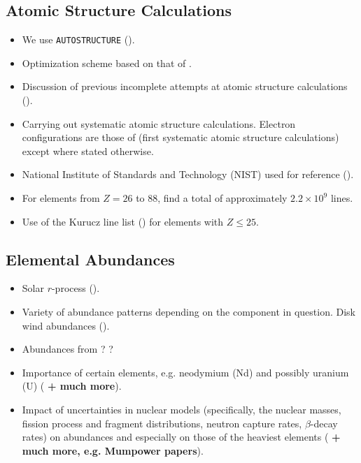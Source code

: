 \documentclass[twocolumn]{aastex63}
\begin{document}
\subsection{Atomic Structure Calculations}\label{ssc:atomic}
\begin{itemize}
    \item We use \texttt{AUTOSTRUCTURE} (\citealt{badnell16}).
    
    \item Optimization scheme based on that of \cite{kasen13}.
    
    \item Discussion of previous incomplete attempts at atomic structure calculations (\citealt{kasen13, tanaka18}).
    
    \item Carrying out systematic atomic structure calculations. Electron configurations are those of \cite{tanaka20} (first systematic atomic structure calculations) except where stated otherwise.
    
    \item National Institute of Standards and Technology (NIST) used for reference (\citealt{kramida19}).
    
    \item For elements from $Z=26$ to $88$, find a total of approximately $2.2\times10^9$ lines.
    
    \item Use of the Kurucz line list (\citealt{kurucz95}) for elements with $Z\leqslant25$.
    
\end{itemize}

\subsection{Elemental Abundances}
\begin{itemize}
    \item Solar $r$-process (\citealt{sneden08}).
    
    \item Variety of abundance patterns depending on the component in question. Disk wind abundances (\citealt{wu16}).
    
    \item Abundances from \cite{wanajo14}? \cite{wanajo18}?
    
    \item Importance of certain elements, e.g. neodymium (Nd) and possibly uranium (U) (\citealt{kasen17, even19} \textbf{+ much more}).
    
    \item Impact of uncertainties in nuclear models (specifically, the nuclear masses, fission process and fragment distributions, neutron capture rates, $\beta$-decay rates) on abundances and especially on those of the heaviest elements (\citealt{eichler15, barnes16, cote18} \textbf{+ much more, e.g. Mumpower papers}).
\end{itemize}
\end{document}
